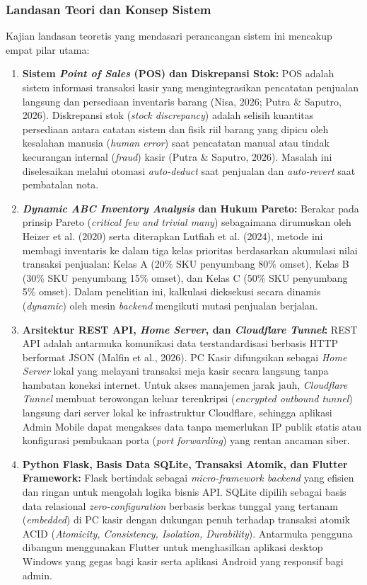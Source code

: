 \documentclass[11pt, a4paper]{article}
\begin{document}
\subsubsection{Landasan Teori dan Konsep Sistem}
Kajian landasan teoretis yang mendasari perancangan sistem ini mencakup empat pilar utama:
\begin{enumerate}[label=\roman*.]
    \item \textbf{Sistem \textit{Point of Sales} (POS) dan Diskrepansi Stok:} POS adalah sistem informasi transaksi kasir yang mengintegrasikan pencatatan penjualan langsung dan persediaan inventaris barang (Nisa, 2026; Putra \& Saputro, 2026). Diskrepansi stok (\textit{stock discrepancy}) adalah selisih kuantitas persediaan antara catatan sistem dan fisik riil barang yang dipicu oleh kesalahan manusia (\textit{human error}) saat pencatatan manual atau tindak kecurangan internal (\textit{fraud}) kasir (Putra \& Saputro, 2026). Masalah ini diselesaikan melalui otomasi \textit{auto-deduct} saat penjualan dan \textit{auto-revert} saat pembatalan nota.
    \item \textbf{\textit{Dynamic ABC Inventory Analysis} dan Hukum Pareto:} Berakar pada prinsip Pareto (\textit{critical few and trivial many}) sebagaimana dirumuskan oleh Heizer et al. (2020) serta diterapkan Lutfiah et al. (2024), metode ini membagi inventaris ke dalam tiga kelas prioritas berdasarkan akumulasi nilai transaksi penjualan: Kelas A (20\% SKU penyumbang 80\% omset), Kelas B (30\% SKU penyumbang 15\% omset), dan Kelas C (50\% SKU penyumbang 5\% omset). Dalam penelitian ini, kalkulasi dieksekusi secara dinamis (\textit{dynamic}) oleh mesin \textit{backend} mengikuti mutasi penjualan berjalan.
    \item \textbf{Arsitektur REST API, \textit{Home Server}, dan \textit{Cloudflare Tunnel}:} REST API adalah antarmuka komunikasi data terstandardisasi berbasis HTTP berformat JSON (Malfin et al., 2026). PC Kasir difungsikan sebagai \textit{Home Server} lokal yang melayani transaksi meja kasir secara langsung tanpa hambatan koneksi internet. Untuk akses manajemen jarak jauh, \textit{Cloudflare Tunnel} membuat terowongan keluar terenkripsi (\textit{encrypted outbound tunnel}) langsung dari server lokal ke infrastruktur Cloudflare, sehingga aplikasi Admin Mobile dapat mengakses data tanpa memerlukan IP publik statis atau konfigurasi pembukaan porta (\textit{port forwarding}) yang rentan ancaman siber.
    \item \textbf{Python Flask, Basis Data SQLite, Transaksi Atomik, dan Flutter Framework:} Flask bertindak sebagai \textit{micro-framework backend} yang efisien dan ringan untuk mengolah logika bisnis API. SQLite dipilih sebagai basis data relasional \textit{zero-configuration} berbasis berkas tunggal yang tertanam (\textit{embedded}) di PC kasir dengan dukungan penuh terhadap transaksi atomik ACID (\textit{Atomicity, Consistency, Isolation, Durability}). Antarmuka pengguna dibangun menggunakan Flutter untuk menghasilkan aplikasi desktop Windows yang gegas bagi kasir serta aplikasi Android yang responsif bagi admin.
\end{enumerate}
\end{document}
